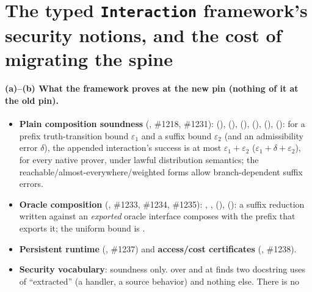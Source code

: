 \section{The typed \texttt{Interaction} framework's security notions, and the cost of migrating the spine}\label{sec:ark-typed}

\paragraph{(a)--(b) What the framework proves at the new pin (nothing of it at the old pin).}
\begin{itemize}
\item \textbf{Plain composition soundness} (, \#1218,
  \#1231):  (),  (),
   (),  (),  (),
   (): for a prefix truth-transition bound $\varepsilon_1$ and a
  suffix bound $\varepsilon_2$ (and an admissibility error $\delta$), the appended interaction's
  success is at most $\varepsilon_1 + \varepsilon_2$ ($\varepsilon_1 + \delta + \varepsilon_2$),
  for every native prover, under lawful distribution semantics; the
  reachable/almost-everywhere/weighted forms allow branch-dependent suffix errors.
\item \textbf{Oracle composition}
  (, \#1233,
  \#1234, \#1235): ,
  ,
   (), 
  (): a suffix reduction written against an \emph{exported} oracle interface composes
  with the prefix that exports it; the uniform bound is
  .
\item \textbf{Persistent runtime} (, \#1237) and
  \textbf{access/cost certificates} (, \#1238).
\item \textbf{Security vocabulary}: soundness only.
   over  and
   at  finds two docstring uses of
  ``extracted'' (a handler, a source behavior) and nothing else. There is no

\end{itemize}

